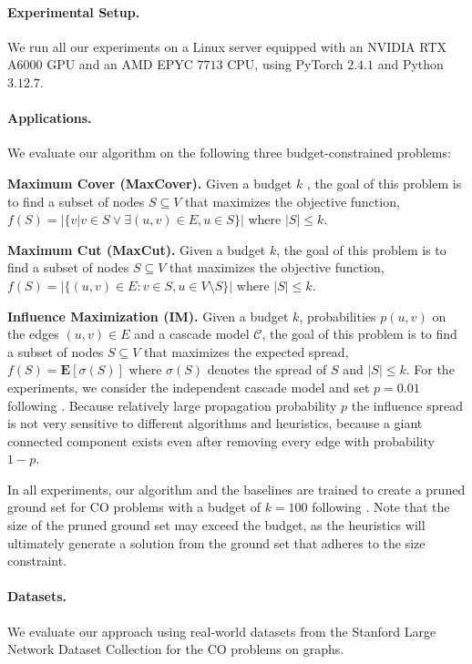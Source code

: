 \documentclass[letterpaper]{article} %
\begin{document}
\paragraph{Experimental Setup.} We run all our experiments on a Linux server equipped with an NVIDIA RTX A6000 GPU and an AMD EPYC $7713$ CPU, using PyTorch $2.4.1$ and Python $3.12.7$.

\paragraph{Applications.} We evaluate our algorithm on the following three budget-constrained problems:

\noindent \textbf{Maximum Cover (MaxCover).} Given a budget $k$ , the goal of this problem is to find a subset of nodes $S \subseteq V$ that maximizes the objective function, $f(S)= |\{v |  v \in S \lor \exists(u,v) \in E , u \in S  \}|$ where $ |S| \leq k$.

\noindent  \textbf{Maximum Cut (MaxCut).} Given a budget $k$, the goal of this problem is to find a subset of nodes $S \subseteq V$ that maximizes the objective function, $f(S)= |\{ (u,v) \in E: v \in S, u \in V \setminus S \}|$ where $ |S| \leq k$.

\noindent \textbf{Influence Maximization (IM).} Given a budget $k$, probabilities $p(u,v)$ on the edges $(u,v)\in E$ and a cascade model $\mathcal{C}$, the goal of this problem is to find a subset of nodes $S \subseteq V$ that maximizes the expected spread, $f(S)= \mathbf{E}[\sigma(S)]$ where $\sigma(S)$ denotes the spread of $S$ and $ |S| \leq k$.  For the experiments, we consider the independent cascade model \citep{kempe2003maximizing} and set $p = 0.01$ following \citet{chen2009efficient}. Because relatively large propagation probability $p$ the influence spread is not very sensitive to different algorithms and heuristics, because a giant connected component exists even after removing every edge with probability $1-p$.


In all experiments, our algorithm and the baselines are trained to create a pruned ground set for CO problems with a budget of \( k = 100 \) following \citet{ireland2022lense}. Note that the size of the pruned ground set may exceed the budget, as the heuristics will ultimately generate a solution from the ground set that adheres to the size constraint.

\paragraph{Datasets.} We evaluate our approach using real-world datasets from the Stanford Large Network Dataset Collection \citep{leskovec2016snap} for the CO problems on graphs.
\end{document}
